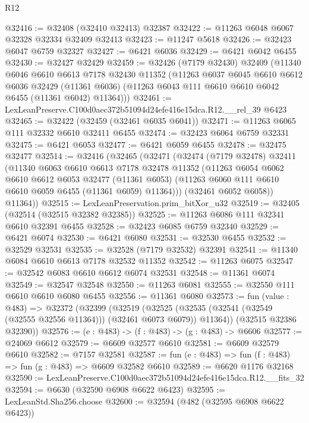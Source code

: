 \begin{lexlean}{R12}
\begin{coremodule}
@32416 := @32408 (@32410 @32413) @32387
@32422 := @11263 @6048 @6067 @32328 @32334 @32409 @32413
@32423 := @11247 @5618
@32426 := @32423 @6047 @6759 @32327
@32427 := @6421 @6036
@32429 := @6421 @6042 @6455
@32430 := @32427 @32429
@32459 := @32426
    (@7179 @32430)
    @32409
    (@11340
      @6046
      @6610
      @6613
      @7178
      @32430
      @11352
      (@11263
        @6037
        @6045
        @6610
        @6612
        @6036
        @32429
        (@11361 @6036)
        (@11263 @6043 @111 @6610 @6610 @6042 @6455 (@11361 @6042) @11364)))
@32461 := LexLeanPreserve.C100d0aec372b51094d24efe416e15dca.R12.__rel_39 @6423
@32465 := @32422 (@32459 (@32461 @6035 @6041))
@32471 := @11263 @6065 @111 @32332 @6610 @32411 @6455
@32474 := @32423 @6064 @6759 @32331
@32475 := @6421 @6053
@32477 := @6421 @6059 @6455
@32478 := @32475 @32477
@32514 := @32416
    (@32465
      (@32471
        (@32474
          (@7179 @32478)
          @32411
          (@11340
            @6063
            @6610
            @6613
            @7178
            @32478
            @11352
            (@11263
              @6054
              @6062
              @6610
              @6612
              @6053
              @32477
              (@11361 @6053)
              (@11263 @6060 @111 @6610 @6610 @6059 @6455 (@11361 @6059) @11364)))
          (@32461 @6052 @6058))
        @11364))
@32515 := LexLeanPreservation.prim_bitXor_u32
@32519 := @32405 (@32514 (@32515 @32382 @32385))
@32525 := @11263 @6086 @111 @32341 @6610 @32391 @6455
@32528 := @32423 @6085 @6759 @32340
@32529 := @6421 @6074
@32530 := @6421 @6080
@32531 := @32530 @6455
@32532 := @32529 @32531
@32535 := @32528 (@7179 @32532) @32391
@32541 := @11340 @6084 @6610 @6613 @7178 @32532 @11352
@32542 := @11263 @6075
@32547 := @32542 @6083 @6610 @6612 @6074 @32531
@32548 := @11361 @6074
@32549 := @32547 @32548
@32550 := @11263 @6081
@32555 := @32550 @111 @6610 @6610 @6080 @6455
@32556 := @11361 @6080
@32573 := fun (value : @483) =>
  @32372
    (@32399
      (@32519
        (@32525 (@32535 (@32541 (@32549 (@32555 @32556 @11364))) (@32461 @6073 @6079)) @11364))
      (@32515 @32386 @32390))
@32576 := (e : @483) -> (f : @483) -> (g : @483) -> @6606
@32577 := @24069 @6612
@32579 := @6609 @32577 @6610
@32581 := @6609 @32579 @6610
@32582 := @7157 @32581
@32587 := fun (e : @483) => fun (f : @483) => fun (g : @483) => @6609 @32582 @6610
@32589 := @6620 @1176 @32168
@32590 := LexLeanPreserve.C100d0aec372b51094d24efe416e15dca.R12.__fits_32
@32594 := @6630 (@32590 @6908 @6622 @6423)
@32595 := LexLeanStd.Sha256.choose
@32600 := @32594 (@482 (@32595 @6908 @6622 @6423))

\end{coremodule}
\end{lexlean}
